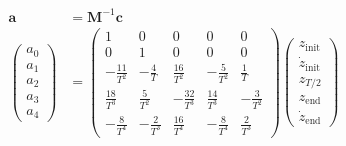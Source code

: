 \begin{align}
	\bm{a}&=\bm{M}^{-1}\bm{c} \\
	\begin{pmatrix}
		a_0 \\
		a_1 \\
		a_2 \\
		a_3 \\
		a_4
	\end{pmatrix} &=
	\begin{pmatrix}
		1 & 0 & 0 & 0 & 0 \\
		0 & 1 & 0 & 0 & 0 \\
		-\frac{11}{T^2} & -\frac{4}{T} & \frac{16}{T^2} & -\frac{5}{T^2} & \frac{1}{T} \\
		\frac{18}{T^3} & \frac{5}{T^2} & -\frac{32}{T^3} & \frac{14}{T^3} & -\frac{3}{T^2} \\
		-\frac{8}{T^4} & -\frac{2}{T^3} & \frac{16}{T^4} & -\frac{8}{T^4} & \frac{2}{T^3}
	\end{pmatrix}
	\begin{pmatrix}
		z_\text{init} \\
		\dot{z}_\text{init} \\
		z_{T/2} \\
		z_\text{end}\\
		\dot{z}_\text{end}
	\end{pmatrix}
\end{align}

